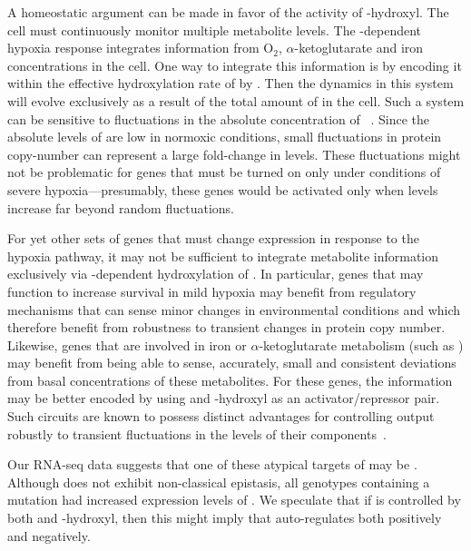 A homeostatic argument can be made in favor of the activity of \hifp{}-hydroxyl.
The cell must continuously monitor multiple metabolite levels. The
-dependent hypoxia response integrates information from O$_2$,
$\alpha$-ketoglutarate and iron concentrations in the cell. One
way to integrate this information is by encoding it within the effective
hydroxylation rate of \hifp{} by \eglp{}. Then the dynamics in this system will
evolve exclusively as a result of the total amount of \hifp{} in the cell. Such
a system can be sensitive to fluctuations in the absolute concentration of
\hifp{}~\citep{Goentoro2009a}. Since the absolute levels of \hifp{} are low in
normoxic conditions, small fluctuations in protein copy-number can represent a
large fold-change in \hifp{} levels. These fluctuations might not be problematic
for genes that must be turned on only under conditions of severe
hypoxia---presumably, these genes would be activated only when \hifp{} levels
increase far beyond random fluctuations.

For yet other sets of genes that must change expression in response to the
hypoxia pathway, it may not be sufficient to integrate metabolite
information exclusively via \eglp{}-dependent hydroxylation of \hifp{}. In
particular, genes that may function to increase survival in mild hypoxia may
benefit from regulatory mechanisms that can sense minor changes in environmental
conditions and which therefore benefit from robustness to transient changes in
protein copy number. Likewise, genes that are involved in iron or
$\alpha$-ketoglutarate metabolism (such as \ftna{}) may benefit from being able
to sense, accurately, small and consistent deviations from basal concentrations
of these metabolites. For these genes, the information may be better encoded by
using \hifp{} and \hifp{}-hydroxyl as an activator/repressor pair. Such circuits
are known to possess distinct advantages for controlling output robustly to
transient fluctuations in the levels of their
components~\citep{Hart2012,Hart2013}.

Our RNA-seq data suggests that one of these atypical targets of \hifp{} may be
\rhyp{}. Although  does not exhibit non-classical epistasis, all
genotypes containing a \hif{} mutation had increased expression levels of
. We speculate that if  is controlled by both \hifp{}
and \hifp{}-hydroxyl, then this might imply that \hifp{} auto-regulates both
positively and negatively.

